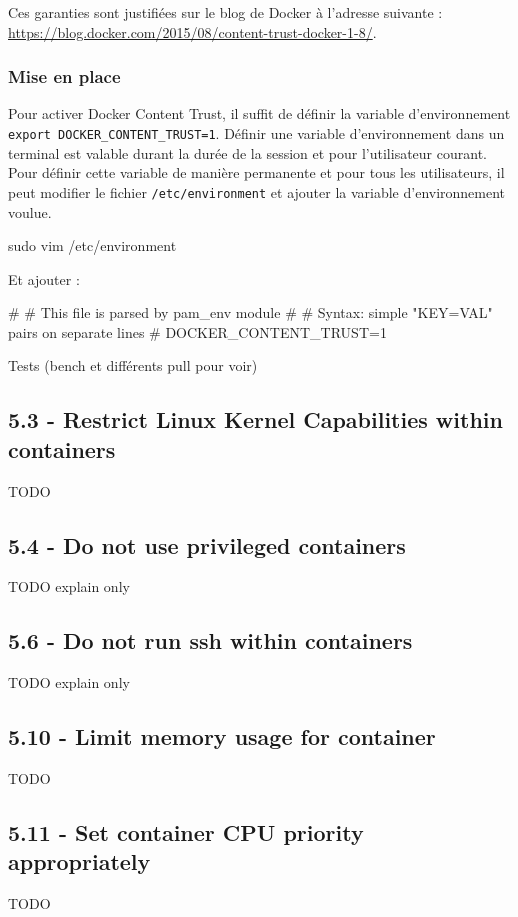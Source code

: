 \documentclass[11pt,a4paper,oneside]{report}
\newcommand{\code}[1]{\texttt{#1}}
\begin{document}
Ces garanties sont justifiées sur le blog de Docker à l'adresse suivante : \url{https://blog.docker.com/2015/08/content-trust-docker-1-8/}.

\subsubsection{Mise en place}
Pour activer Docker Content Trust, il suffit de définir la variable d'environnement \linebreak \code{export DOCKER\_CONTENT\_TRUST=1}. Définir une variable d'environnement dans un terminal est valable durant la durée de la session et pour l'utilisateur courant. Pour définir cette variable de manière permanente et pour tous les utilisateurs, il peut modifier le fichier \code{/etc/environment} et ajouter la variable d'environnement voulue.

\begin{bashcode}
sudo vim /etc/environment
\end{bashcode}

Et ajouter :
\begin{bashcode}
#
# This file is parsed by pam_env module
#
# Syntax: simple "KEY=VAL" pairs on separate lines
#
DOCKER_CONTENT_TRUST=1
\end{bashcode}

Tests (bench et différents pull pour voir)



\subsection{5.3  - Restrict Linux Kernel Capabilities within containers}
TODO

\subsection{5.4  - Do not use privileged containers}
TODO explain only

\subsection{5.6  - Do not run ssh within containers}
TODO explain only

\subsection{5.10 - Limit memory usage for container}
TODO

\subsection{5.11 - Set container CPU priority appropriately}
TODO
\end{document}
